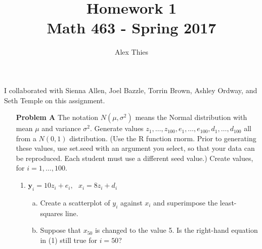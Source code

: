 \documentclass{amsart}
\author{Alex Thies}
\title{Homework 1 \\ Math 463 - Spring 2017}
\begin{document}
	\maketitle

	 I collaborated with Sienna Allen, Joel Bazzle, Torrin Brown, Ashley Ordway, and Seth Temple on this assignment. \\


	\begin{enumerate}
		\item[\textbf{Problem A}] The notation $N(\mu,\sigma^{2})$ means the Normal distribution with mean $\mu$ and variance $\sigma^{2}$.
		Generate values $z_{1},\dots,z_{100},e_{1},\dots,e_{100},d_{1},\dots,d_{100}$ all from a $N(0,1)$ distribution. 
		(Use the R function rnorm. 
		Prior to generating these values, use set.seed with an argument you select, so that your data can be reproduced. 
		Each student must use a different seed value.) 
		Create values, for $i =1,\dots,100$.
			\begin{enumerate}[(1)]
				\item $\mathbf{y}_{i} = 10z_{i}+e_{i}, \ \ \ x_{i} = 8z_{i} + d_{i}$
					\begin{enumerate}[(a)]
						\item Create a scatterplot of $y_{i}$ against $x_{i}$ and superimpose the least-squares line.
						\item Suppose that $x_{50}$ is changed to the value 5. 
						Is the right-hand equation in (1) still true for $i = 50$? 
					\end{enumerate}


\end{enumerate}
\end{enumerate}
\end{document}
